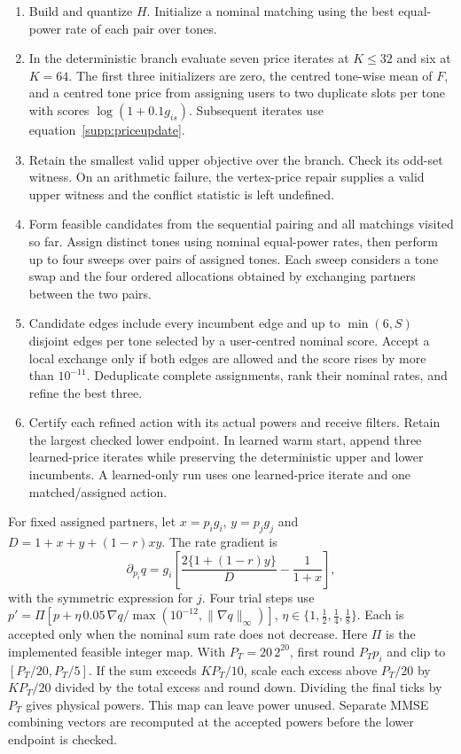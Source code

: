 \begin{enumerate}
\item Build and quantize \(H\). Initialize a nominal matching using the
best equal-power rate of each pair over tones.
\item In the deterministic branch evaluate seven price iterates at \(K\le32\) and six
at \(K=64\). The first three initializers are zero, the centred tone-wise
mean of \(F\), and a centred tone price from assigning users to two duplicate
slots per tone with scores \(\log(1+0.1g_{is})\).
Subsequent iterates use equation~\eqref{supp:priceupdate}.
\item Retain the smallest valid upper objective over the branch. Check its
odd-set witness. On an arithmetic failure, the vertex-price repair supplies
a valid upper witness and the conflict statistic is left undefined.
\item Form feasible candidates from the sequential pairing and all matchings
visited so far. Assign distinct tones using nominal equal-power rates,
then perform up to four sweeps over pairs of assigned tones.
Each sweep considers a tone swap and the four ordered allocations obtained
by exchanging partners between the two pairs.
\item Candidate edges include every incumbent edge and up to
\(\min(6,S)\) disjoint edges per tone selected by a user-centred nominal score.
Accept a local exchange only if both edges are allowed and the score rises
by more than \(10^{-11}\). Deduplicate complete assignments, rank their
nominal rates, and refine the best three.
\item Certify each refined action with its actual powers and receive filters.
Retain the largest checked lower endpoint. In learned warm start, append
three learned-price iterates while preserving the deterministic upper and lower
incumbents. A learned-only run uses one learned-price iterate and one
matched/assigned action.
\end{enumerate}

For fixed assigned partners, let \(x=p_i g_i\), \(y=p_j g_j\) and
\(D=1+x+y+(1-r)xy\). The rate gradient is
\[
 \partial_{p_i}q=g_i\!\left[\frac{2\{1+(1-r)y\}}{D}
                  -\frac{1}{1+x}\right],
\]
with the symmetric expression for \(j\).
Four trial steps use
\(p'=\Pi[p+\eta\,0.05\,\nabla q/\max(10^{-12},\|\nabla q\|_\infty)]\),
\(\eta\in\{1,\tfrac12,\tfrac14,\tfrac18\}\).
Each is accepted only when the nominal sum rate does not decrease.
Here \(\Pi\) is the implemented feasible integer map. With
\(P_T=20\,2^{20}\), first round \(P_Tp_i\) and clip to
\([P_T/20,P_T/5]\). If the sum exceeds \(KP_T/10\), scale each excess
above \(P_T/20\) by \(KP_T/20\) divided by the total excess and round
down. Dividing the final ticks by \(P_T\) gives physical powers.
This map can leave power unused. Separate MMSE combining vectors
are recomputed at the accepted powers before the lower endpoint is checked.

